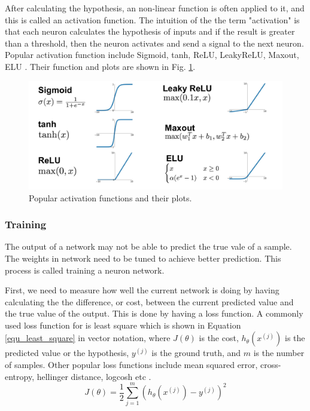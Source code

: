 After calculating the hypothesis, an non-linear function is often applied to it, and this is called an activation function. The intuition of the the term "activation" is that each neuron calculates the hypothesis of inputs and if the result is greater than a threshold, then the neuron activates and send a signal to the next neuron. Popular activation function include Sigmoid, tanh, ReLU, LeakyReLU, Maxout, ELU \cite{goodfellow2016deep}. Their function and plots are shown in Fig. \ref{fig_activation_func}.
\begin{figure}[h!]
\begin{center}
\includegraphics[width = 13cm]{img/activation_function.png}
\caption[Popular activation functions and their plots]{Popular activation functions and their plots.\label{fig_activation_func}}
\end{center}
\end{figure}

\subsubsection{Training}
The output of a network may not be able to predict the true vale of a sample. The weights in network need to be tuned to achieve better prediction. This process is called training a neuron network.

First, we need to measure how well the current network is doing by having calculating the the difference, or cost, between the current predicted value and the true value of the output. This is done by having a loss function. A commonly used loss function for is least square which is shown in Equation \ref{equ_least_square} in vector notation, where $J(\theta)$ is the cost, $h_\theta(x^{(j)})$ is the predicted value or the hypothesis, $y^{(j)}$ is the ground truth, and $m$ is the number of samples. Other popular loss functions include mean squared error, cross-entropy, hellinger distance, logcosh etc \cite{goodfellow2016deep}.
\begin{equation}
J(\theta)=\frac{1}{2}\sum^m_{j=1}(h_\theta(x^{(j)}) - y^{(j)})^2
 \label{equ_least_square}
\end{equation}

